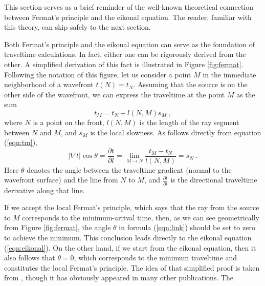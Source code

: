
This section serves as a brief reminder of the well-known theoretical
connection between Fermat's principle and the eikonal equation.  The
reader, familiar with this theory, can skip safely to the next
section.

\par
Both Fermat's principle and the eikonal equation can serve as the
foundation of traveltime calculations. In fact, either one can be
rigorously derived from the other. A simplified derivation of this
fact is illustrated in Figure \ref{fig:fermat}. Following the notation
of this figure, let us consider a point $M$ in the immediate
neighborhood of a wavefront $t (N) = t_N$.  Assuming that the source
is on the other side of the wavefront, we can express the traveltime
at the point $M$ as the sum
\begin{equation}\label{eqn:tm}
  t_M = t_N + l (N,M) s_M\;,
\end{equation}
where $N$ is a point on the front, $l (N,M)$ is the length of the
ray segment between $N$ and $M$, and $s_M$ is the local slowness.
As follows directly from equation (\ref{eqn:tm}),
\begin{equation}\label{eqn:link}
  \left|\nabla t\right| \cos{\theta} = \frac{\partial t}{\partial l}
  = \lim_{M \rightarrow N} \frac{t_M - t_N}{l (N,M)} = s_N\;.
\end{equation}
Here $\theta$ denotes the angle between the traveltime gradient (normal
to the wavefront surface) and the line from $N$ to $M$, and
$\frac{\partial t}{\partial l}$ is the directional traveltime derivative along
that line.
\par
If we accept the local Fermat's principle, which says that the ray
from the source to $M$ corresponds to the minimum-arrival time, then,
as we can see geometrically from Figure \ref{fig:fermat}, the angle
$\theta$ in formula (\ref{eqn:link}) should be set to zero to achieve
the minimum. This conclusion leads directly to the eikonal equation
(\ref{eqn:eikonal}). On the other hand, if we start from the eikonal
equation, then it also follows that $\theta=0$, which corresponds to
the minimum traveltime and constitutes the local Fermat's principle.
The idea of that simplified proof is taken from \cite{lanc},
though it has obviously appeared in many other publications. The
